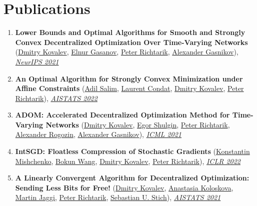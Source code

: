 \section{Publications}
\begin{enumerate}
\item \textbf{Lower Bounds and Optimal Algorithms for Smooth and Strongly Convex Decentralized Optimization Over Time-Varying Networks} (\href{https://www.dmitry-kovalev.com}{\color{linkcolour}Dmitry Kovalev}, \href{https://elnurgasanov.com}{\color{linkcolour}Elnur Gasanov}, \href{https://richtarik.org}{\color{linkcolour}Peter Richtarik}, \href{https://scholar.google.ru/citations?user=AmeE8qkAAAAJ}{\color{linkcolour}Alexander Gasnikov}), \href{https://proceedings.neurips.cc/paper/2021/hash/bc37e109d92bdc1ea71da6c919d54907-Abstract.html}{\em \color{black}NeurIPS 2021}
\item \textbf{An Optimal Algorithm for Strongly Convex Minimization under Affine Constraints} (\href{https://adil-salim.github.io}{\color{linkcolour}Adil Salim}, \href{https://lcondat.github.io}{\color{linkcolour}Laurent Condat}, \href{https://www.dmitry-kovalev.com}{\color{linkcolour}Dmitry Kovalev}, \href{https://richtarik.org}{\color{linkcolour}Peter Richtarik}), \href{http://aistats.org/aistats2022/accepted.html}{\em \color{black}AISTATS 2022}
\item \textbf{ADOM: Accelerated Decentralized Optimization Method for Time-Varying Networks} (\href{https://www.dmitry-kovalev.com}{\color{linkcolour}Dmitry Kovalev}, \href{https://shulgin-egor.github.io}{\color{linkcolour}Egor Shulgin}, \href{https://richtarik.org}{\color{linkcolour}Peter Richtarik}, \href{https://scholar.google.com/citations?user=sEjyzkgAAAAJ}{\color{linkcolour}Alexander Rogozin}, \href{https://scholar.google.ru/citations?user=AmeE8qkAAAAJ}{\color{linkcolour}Alexander Gasnikov}), \href{http://proceedings.mlr.press/v139/kovalev21a}{\em \color{black}ICML 2021}
\item \textbf{IntSGD: Floatless Compression of Stochastic Gradients} (\href{https://konstmish.github.io}{\color{linkcolour}Konstantin Mishchenko}, \href{https://bokunwang1.github.io}{\color{linkcolour}Bokun Wang}, \href{https://www.dmitry-kovalev.com}{\color{linkcolour}Dmitry Kovalev}, \href{https://richtarik.org}{\color{linkcolour}Peter Richtarik}), \href{https://openreview.net/forum?id=pFyXqxChZc}{\em \color{black}ICLR 2022}
\item \textbf{A Linearly Convergent Algorithm for Decentralized Optimization: Sending Less Bits for Free!} (\href{https://www.dmitry-kovalev.com}{\color{linkcolour}Dmitry Kovalev}, \href{https://scholar.google.com/citations?user=ldJpvE8AAAAJ}{\color{linkcolour}Anastasia Koloskova}, \href{https://people.epfl.ch/martin.jaggi}{\color{linkcolour}Martin Jaggi}, \href{https://richtarik.org}{\color{linkcolour}Peter Richtarik}, \href{https://sstich.ch}{\color{linkcolour}Sebastian U. Stich}), \href{http://proceedings.mlr.press/v130/kovalev21a}{\em \color{black}AISTATS 2021}

\end{enumerate}
